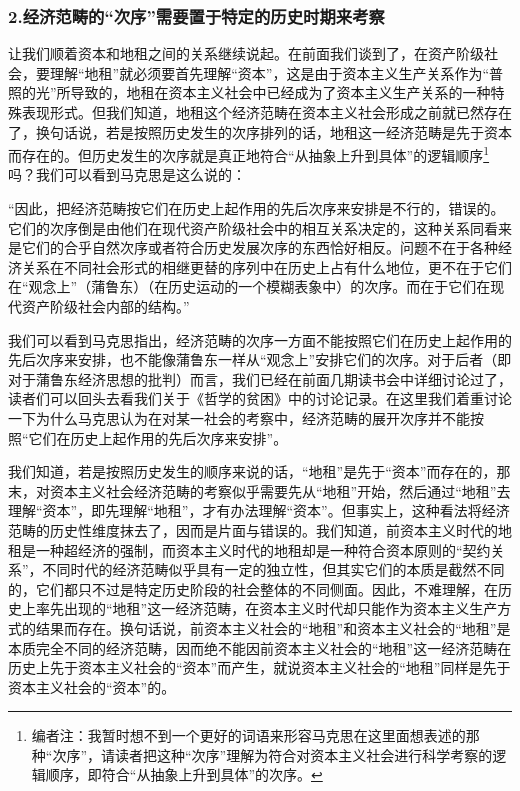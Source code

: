 \documentclass[a4paper,twoside,12pt,AutoFakeBold]{ctexart}
\begin{document}
\subsubsection{2.经济范畴的“次序”需要置于特定的历史时期来考察}

让我们顺着资本和地租之间的关系继续说起。在前面我们谈到了，在资产阶级社会，要理解“地租”就必须要首先理解“资本”，这是由于资本主义生产关系作为“普照的光”所导致的，地租在资本主义社会中已经成为了资本主义生产关系的一种特殊表现形式。但我们知道，地租这个经济范畴在资本主义社会形成之前就已然存在了，换句话说，若是按照历史发生的次序排列的话，地租这一经济范畴是先于资本而存在的。但历史发生的次序就是真正地符合“从抽象上升到具体”的逻辑顺序\footnote{编者注：我暂时想不到一个更好的词语来形容马克思在这里面想表述的那种“次序”，请读者把这种“次序”理解为符合对资本主义社会进行科学考察的逻辑顺序，即符合“从抽象上升到具体”的次序。}吗？我们可以看到马克思是这么说的：
\begin{adjustwidth}{2em}{2em}
    \qquad\fangsong
    “因此，把经济范畴按它们在历史上起作用的先后次序来安排是不行的，错误的。它们的次序倒是由他们在现代资产阶级社会中的相互关系决定的，这种关系同看来是它们的合乎自然次序或者符合历史发展次序的东西恰好相反。问题不在于各种经济关系在不同社会形式的相继更替的序列中在历史上占有什么地位，更不在于它们在“观念上”（蒲鲁东）（在历史运动的一个模糊表象中）的次序。而在于它们在现代资产阶级社会内部的结构。”
\end{adjustwidth}

我们可以看到马克思指出，经济范畴的次序一方面不能按照它们在历史上起作用的先后次序来安排，也不能像蒲鲁东一样从“观念上”安排它们的次序。对于后者（即对于蒲鲁东经济思想的批判）而言，我们已经在前面几期读书会中详细讨论过了，读者们可以回头去看我们关于《哲学的贫困》中的讨论记录。在这里我们着重讨论一下为什么马克思认为在对某一社会的考察中，经济范畴的展开次序并不能按照“它们在历史上起作用的先后次序来安排”。

我们知道，若是按照历史发生的顺序来说的话，“地租”是先于“资本”而存在的，那末，对资本主义社会经济范畴的考察似乎需要先从“地租”开始，然后通过“地租”去理解“资本”，即先理解“地租”，才有办法理解“资本”。但事实上，这种看法将经济范畴的历史性维度抹去了，因而是片面与错误的。我们知道，前资本主义时代的地租是一种超经济的强制，而资本主义时代的地租却是一种符合资本原则的“契约关系”，不同时代的经济范畴似乎具有一定的独立性，但其实它们的本质是截然不同的，它们都只不过是特定历史阶段的社会整体的不同侧面。因此，不难理解，在历史上率先出现的“地租”这一经济范畴，在资本主义时代却只能作为资本主义生产方式的结果而存在。换句话说，前资本主义社会的“地租”和资本主义社会的“地租”是本质完全不同的经济范畴，因而绝不能因前资本主义社会的“地租”这一经济范畴在历史上先于资本主义社会的“资本”而产生，就说资本主义社会的“地租”同样是先于资本主义社会的“资本”的。
\end{document}
